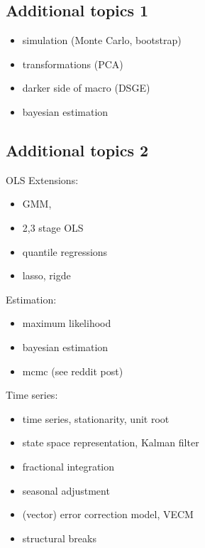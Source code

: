 \documentclass[letterpaper,10pt,english]{sphinxmanual}
\begin{document}
\subsection{Additional topics 1}
\label{\detokenize{how-to-teach/mindmap:additional-topics-1}}\begin{itemize}
\item {} 
simulation (Monte Carlo, bootstrap)

\item {} 
transformations (PCA)

\item {} 
darker side of macro (DSGE)

\item {} 
bayesian estimation

\end{itemize}


\subsection{Additional topics 2}
\label{\detokenize{how-to-teach/mindmap:additional-topics-2}}
OLS Extensions:
\begin{itemize}
\item {} 
GMM,

\item {} 
2,3 stage OLS

\item {} 
quantile regressions

\item {} 
lasso, rigde

\end{itemize}

Estimation:
\begin{itemize}
\item {} 
maximum likelihood

\item {} 
bayesian estimation

\item {} 
mcmc (see reddit post)

\end{itemize}

Time series:
\begin{itemize}
\item {} 
time series, stationarity, unit root

\item {} 
state space representation, Kalman filter

\item {} 
fractional integration

\item {} 
seasonal adjustment

\item {} 
(vector) error correction model, VECM

\item {} 
structural breaks

\end{itemize}
\end{document}
